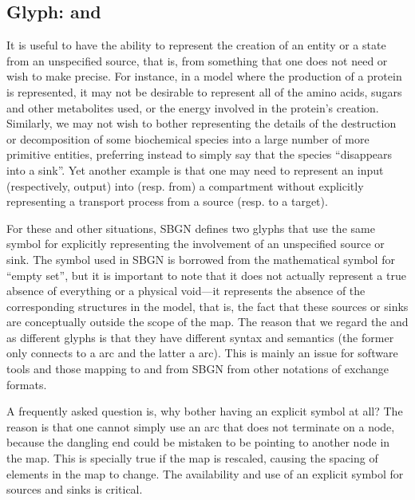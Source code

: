 
\subsection{Glyph:  and }
\label{sec:sourceSink}

It is useful to have the ability to represent the creation of an entity or
a state from an unspecified source, that is, from something that one does
not need or wish to make precise.  For instance, in a model where the
production of a protein is represented, it may not be desirable to
represent all of the amino acids, sugars and other metabolites used, or the
energy involved in the protein's creation.  Similarly, we may not wish to
bother representing the details of the destruction or decomposition of some
biochemical species into a large number of more primitive entities,
preferring instead to simply say that the species ``disappears into a
sink''.  Yet another example is that one may need to represent an input
(respectively, output) into (resp. from) a compartment without explicitly
representing a transport process from a source (resp. to a target).

For these and other situations, SBGN defines two glyphs that use the same symbol for explicitly
representing the involvement of an unspecified source or sink.  The symbol
used in SBGN is borrowed from the mathematical symbol for ``empty set'',
but it is important to note that it does not actually represent a true
absence of everything or a physical void---it represents the absence of the
corresponding structures in the model, that is, the fact that these sources
or sinks are conceptually outside the scope of the map. The reason that we
regard the  and  as different glyphs is that they have different
syntax and semantics (the former only connects to a  arc and the latter
a  arc). This is mainly an issue for software tools and those mapping to
and from SBGN from other notations of exchange formats.

A frequently asked question is, why bother having an explicit symbol at
all?  The reason is that one cannot simply use an arc that does not
terminate on a node, because the dangling end could be mistaken to be
pointing to another node in the map.  This is specially true if the
map is rescaled, causing the spacing of elements in the map to
change.  The availability and use of an explicit symbol for sources and
sinks is critical.

